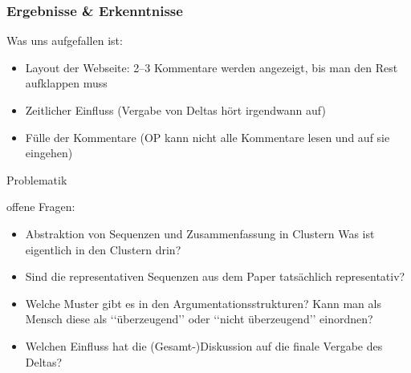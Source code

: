 \documentclass[compress,12pt]{beamer}
\begin{document}
    \begin{frame}
        \frametitle{Ergebnisse \& Erkenntnisse}
        Was uns aufgefallen ist:
        \begin{itemize}
            \item Layout der Webseite: 2--3 Kommentare werden angezeigt, bis man den Rest aufklappen muss
            \item Zeitlicher Einfluss (Vergabe von Deltas hört irgendwann auf)
            \item Fülle der Kommentare (OP kann nicht alle Kommentare lesen und auf sie eingehen)
        \end{itemize}
    \end{frame}

    \begin{frame}{Problematik}
        \item offene Fragen:
        \begin{itemize}
            \item Abstraktion von Sequenzen und Zusammenfassung in Clustern \textrightarrow{} Was ist eigentlich in den Clustern drin?
            \item Sind die representativen Sequenzen aus dem Paper tatsächlich representativ?
            \item Welche Muster gibt es in den Argumentationsstrukturen?
            Kann man als Mensch diese als \lq\lq{}überzeugend\rq\rq{} oder \lq\lq{}nicht überzeugend\rq\rq{} einordnen?
            \item Welchen Einfluss hat die (Gesamt-)Diskussion auf die finale Vergabe des Deltas?
        \end{itemize}
    \end{frame}

\end{document}
